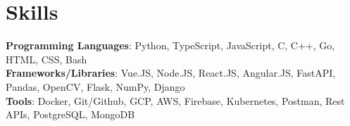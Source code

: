 \documentclass[letterpaper,11pt]{article}
\begin{document}
\section{Skills}
 \begin{itemize}[leftmargin=0.15in, label={}]
    \small{\item{
     \textbf{Programming Languages}{: Python, TypeScript, JavaScript, C, C++, Go, HTML, CSS, Bash} \\
     \textbf{Frameworks/Libraries}{: Vue.JS, Node.JS, React.JS, Angular.JS, FastAPI, Pandas, OpenCV, Flask, NumPy, Django} \\
     \textbf{Tools}{: Docker, Git/Github, GCP, AWS, Firebase, Kubernetes, Postman, Rest APIs, PostgreSQL, MongoDB}
    }}
 \end{itemize}


\end{document}

